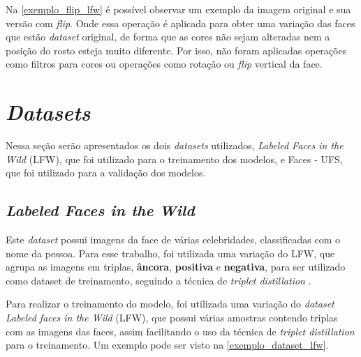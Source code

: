 Na \autoref{exemplo_flip_lfw} é possível observar um exemplo da imagem original e sua versão com \textit{flip}.
Onde essa operação é aplicada para obter uma variação das faces que estão \textit{dataset} original, de forma que as
cores não sejam alteradas nem a posição do rosto esteja muito diferente.
Por isso, não foram aplicadas operações como filtros para cores ou operações como rotação ou \textit{flip} vertical da
face.

\section{\textit{Datasets}}\label{sec_datasets}
Nessa seção serão apresentados os dois \textit{datasets} utilizados, \textit{Labeled Faces in the Wild} (LFW),
que foi utilizado para o treinamento dos modelos, e Faces - UFS, que foi utilizado para a validação dos modelos.

\subsection{\textit{Labeled Faces in the Wild}}
Este \textit{dataset} possui imagens da face de várias celebridades, classificadas com o nome da pessoa.
Para esse trabalho, foi utilizada uma variação do LFW, que agrupa as imagens em triplas, \textbf{âncora},
\textbf{positiva} e \textbf{negativa}, para ser utilizado como dataset de treinamento, seguindo a técnica
de \textit{triplet distillation} \cite{triplet_distillation_face_recognition}.

Para realizar o treinamento do modelo, foi utilizada uma variação do \textit{dataset}
\textit{Labeled faces in the Wild} (LFW), que possui várias amostras contendo triplas com as imagens das faces,
assim facilitando o uso da técnica de \textit{triplet distillation} para o treinamento. Um exemplo pode ser visto
na \autoref{exemplo_dataset_lfw}.

